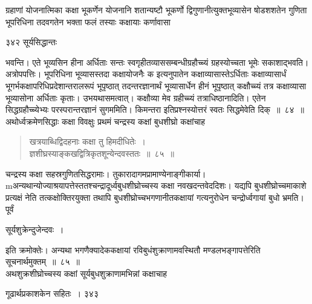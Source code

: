 \documentclass[11pt, openany]{book}
\begin{document}
 ग्रहाणां योजनात्मिका कक्षा भूकर्णेन योजनानि शतान्यष्टौ भूकर्णो द्विगुणानीत्युक्तभूव्यासेन षोडशशतेन गुणिता भूपरिधिना तदवगतेन भक्ता फलं तस्याः कक्षायाः कर्णावासा \textendash


\newpage


\noindent ३४२ \hspace{4cm} सूर्यसिद्धान्तः
\vspace{1cm}


\noindent भवन्ति। एते भूव्यसिन हीना अर्धिताः सन्तः स्वगृहीतव्याससम्बन्धीग्रहौच्च्यं ग्रहस्योच्चता भूमेः सकाशाद्भवति। अत्रोपपत्तिः। भूपरिधिना भूव्यासस्तदा कक्षायोजनैः क इत्यनुपातेन कक्षाव्यासास्तेऽर्धिताः कक्षाव्यासार्धं भूगर्भकक्षापरिधिप्रदेशान्तरालरूपं भूपृष्ठात् तदन्तरज्ञानार्थं भूव्यासार्धेन हीनं भूपृष्ठात् कक्षौच्च्यं तत्र कक्षाव्यासा भूव्यासोना अर्धिताः कृताः। उभयथासमत्वात्। कक्षौव्या मेव ग्रहीच्च्यं तत्राधिष्ठानादिति। एतेन सिद्धग्रहौच्च्येभ्यः परस्परान्तरज्ञानं सुगममिति। किमन्तरा इतिप्रश्नस्योत्तरं स्वतः सिद्धमेवेति दिक्~॥~८४~॥\\
अथोर्ध्वक्रमेणसिद्धाः कक्षा विवक्षुः प्रथमं चन्द्रस्य कक्षां बुधशीघ्रो  कक्षांचाह \textendash


\begin{quote}
{\ssi खत्रयाब्धिद्विदहनाः कक्षा तु हिमदीधितेः~।\\
ज्ञशीघ्रस्याङ्कखद्वित्रिकृतशून्येन्दवस्ततः~॥~८५~॥}
\end{quote}
 चन्द्रस्य कक्षा सहस्रगुणितसिद्धरामाः। तुकारादागमप्रामाण्येनाङ्गीकार्या।mअन्यथान्योज्याश्रयापत्तेस्ततश्चन्द्रादूर्ध्वबुधशीघ्रोच्चस्य कक्षा नवखदन्तवेददिशः। यद्यपि बुधशीघ्रोच्चमाकाशे प्रत्यक्षं नेति तत्कक्षोक्तिरयुक्ता तथापि बुधशीघ्रोच्चभगणानीतकक्षायां गत्यनुरोधेन चन्द्रोर्ध्वगायां बुधो भ्रमति। पूर्वं \textendash

\begin{center}
{\qt सूर्यशुक्रेन्दुजेन्दवः~।} 
\end{center}

इति क्रमोक्तेः। अन्यथा भगणैक्यादेककक्षायां रविबुधंशुक्राणामवस्थितौ मण्डलभङ्गापत्तेरिति सूचनार्थमुक्तम्~॥~८५~॥ \\
\noindent अथशुक्रशीघ्रोच्चस्य कक्षां सूर्यबुधशुक्राणामभिन्नां कक्षाचाह \textendash


\newpage


\hspace{3cm} गूढार्थप्रकाशकेन सहितः~। \hfill ३४३
\vspace{1cm}
\end{document}
